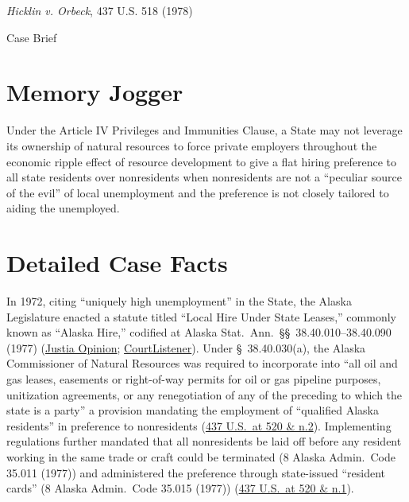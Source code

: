 \documentclass[12pt]{article}
\begin{document}
\begin{center}
{\LARGE \textit{Hicklin v. Orbeck}, 437 U.S. 518 (1978)\par}
\vspace{0.8em}
{\large Case Brief\par}
\end{center}
\vspace{1em}

\section{Memory Jogger}

Under the Article IV Privileges and Immunities Clause, a State may not leverage its ownership of natural resources to force private employers throughout the economic ripple effect of resource development to give a flat hiring preference to all state residents over nonresidents when nonresidents are not a ``peculiar source of the evil'' of local unemployment and the preference is not closely tailored to aiding the unemployed.

\section{Detailed Case Facts}

In 1972, citing ``uniquely high unemployment'' in the State, the Alaska Legislature enacted a statute titled ``Local Hire Under State Leases,'' commonly known as ``Alaska Hire,'' codified at Alaska Stat.\ Ann.\ \S\S\ 38.40.010--38.40.090 (1977) (\href{https://supreme.justia.com/cases/federal/us/437/518/}{Justia Opinion}; \href{https://www.courtlistener.com/opinion/109911/hicklin-v-orbeck/}{CourtListener}). Under \S\ 38.40.030(a), the Alaska Commissioner of Natural Resources was required to incorporate into ``all oil and gas leases, easements or right-of-way permits for oil or gas pipeline purposes, unitization agreements, or any renegotiation of any of the preceding to which the state is a party'' a provision mandating the employment of ``qualified Alaska residents'' in preference to nonresidents (\href{https://supreme.justia.com/cases/federal/us/437/518/}{437 U.S.\ at 520 \& n.2}). Implementing regulations further mandated that all nonresidents be laid off before any resident working in the same trade or craft could be terminated (8 Alaska Admin.\ Code 35.011 (1977)) and administered the preference through state-issued ``resident cards'' (8 Alaska Admin.\ Code 35.015 (1977)) (\href{https://supreme.justia.com/cases/federal/us/437/518/}{437 U.S.\ at 520 \& n.1}).
\end{document}
